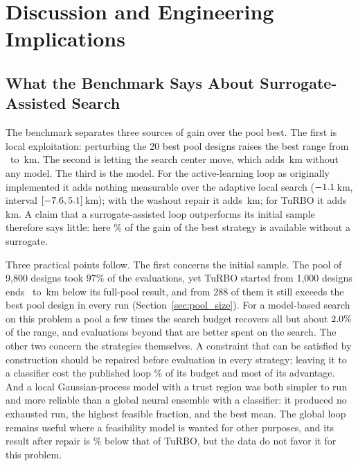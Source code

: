 \section{Discussion and Engineering Implications}
\label{sec:discussion}

\subsection{What the Benchmark Says About Surrogate-Assisted Search}
\label{sec:boundary_dominance}
The benchmark separates three sources of gain over the pool best. The first is local exploitation: perturbing the 20 best pool designs raises the best range from \NvPool\ to \NvMeanLocTen\,km. The second is letting the search center move, which adds \NvDAdaptvLocTen\,km without any model. The third is the model. For the active-learning loop as originally implemented it adds nothing measurable over the adaptive local search ($-1.1$\,km, interval $[-7.6, 5.1]$\,km); with the washout repair it adds \NvDALRvAdapt\,km; for TuRBO it adds \NvDTurbovAdapt\,km. A claim that a surrogate-assisted loop outperforms its initial sample therefore says little: here \NvShareAdapt\% of the gain of the best strategy is available without a surrogate.

Three practical points follow. The first concerns the initial sample. The pool of 9{,}800 designs took $97\%$ of the evaluations, yet TuRBO started from 1{,}000 designs ends \NpTurboLossB\ to \NpIndTurboVsFull\,km below its full-pool result, and from 288 of them it still exceeds the best pool design in every run (Section~\ref{sec:pool_size}). For a model-based search on this problem a pool a few times the search budget recovers all but about $2.0\%$ of the range, and evaluations beyond that are better spent on the search. The other two concern the strategies themselves. A constraint that can be satisfied by construction should be repaired before evaluation in every strategy; leaving it to a classifier cost the published loop \NvWashAL\% of its budget and most of its advantage. And a local Gaussian-process model with a trust region was both simpler to run and more reliable than a global neural ensemble with a classifier: it produced no exhausted run, the highest feasible fraction, and the best mean. The global loop remains useful where a feasibility model is wanted for other purposes, and its result after repair is \NvPctTurbovALR\% below that of TuRBO, but the data do not favor it for this problem.

